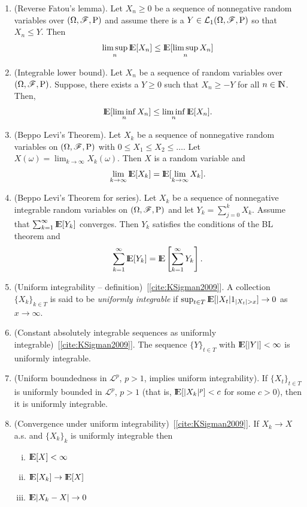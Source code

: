 \documentclass[a4paper,10pt]{scrbook}
\begin{document}
\begin{enumerate}
 \item 	(Reverse Fatou's lemma). Let $X_n\geq 0$ be a sequence of nonnegative random variables over $(\Omega,\mathscr{F},\mathrm{P})$ and
	assume there is a $Y\in\mathcal{L}_1(\Omega,\mathscr{F},\mathrm{P})$ so that $X_n\leq Y$. Then
	\[ 
	 \limsup_n \E[X_n] \leq \E[\limsup_n X_n]
	\]
 \item (Integrable lower bound). 	
	Let $X_n$ be a sequence of random variables over $(\Omega,\mathscr{F},\mathrm{P})$. Suppose, there exists a
	$Y\geq 0$ such that $X_n\geq -Y$ for all $n\in\N$. Then,
	\[
	\E[\liminf_n X_n] \leq  \liminf_n \E[X_n].
	\]
 \item (Beppo Levi's Theorem).
	Let $X_k$ be a sequence of nonnegative random variables on $(\Omega,\mathscr{F},\mathrm{P})$ with $0 \leq X_1 \leq X_{2} \leq \ldots$. 
	Let $X(\omega) = \lim_{k\to\infty}X_k(\omega)$. Then $X$ is a random variable and 
	\[
	 \lim_{k\to\infty} \E[X_k] = \E[\lim_{k\to\infty} X_k].
	\]
 \item (Beppo Levi's Theorem for series).
       Let $X_k$ be a sequence of nonnegative integrable random variables on $(\Omega,\mathscr{F},\mathrm{P})$
       and let $Y_k = \sum_{j=0}^k X_k$. Assume that $\sum_{k=1}^{\infty} \E[Y_k]$ converges.
       Then $Y_k$ satisfies the conditions of the BL theorem and
       \[
        \sum_{k=1}^{\infty} \E[Y_k] = \E \left[\sum_{k=1}^{\infty}Y_k\right].
       \]

 \item (Uniform integrability -- definition)~[\ref{cite:KSigman2009}]. A collection $\{X_k\}_{k\in T}$ is said to be \textit{uniformly
        integrable} if $\sup_{t\in T}\E[|X_t| 1_{|X_t|>x}] \to 0$ as $x\to\infty$.
        
 \item (Constant absolutely integrable sequences as uniformly integrable)~[\ref{cite:KSigman2009}]. The sequence $\{Y\}_{t\in T}$
       with $\E[|Y|]<\infty$ is uniformly integrable.

 \item (Uniform boundedness in $\mathcal{L}^p$, $p>1$, implies uniform integrability).
       If $\{X_t\}_{t\in T}$ is uniformly bounded in $\mathcal{L}^p$, $p>1$ (that is, 
       $\E[|X_k|^p] < c$ for some $c>0$), then it is uniformly integrable.
       
 \item (Convergence under uniform integrability)~[\ref{cite:KSigman2009}]. If $X_k \to X$ a.s. and $\{X_k\}_k$ is uniformly 
       integrable then
       \begin{enumerate}[i.]
         \item $\E[X]< \infty$
         \item $\E[X_k] \to \E[X]$        
        \item $\E|X_k-X|\to 0$
       \end{enumerate}

\end{enumerate}
\end{document}

